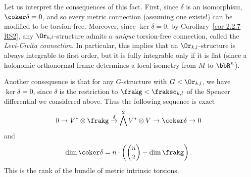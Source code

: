\begin{example}
    Let us interpret the consequences of this fact. First, since $\delta$ is an isomorphism, $\coker\delta=0$, and so every metric connection (assuming one exists!) can be modified to be torsion-free. Moreover, since $\ker\delta=0$, by Corollary~\ref{cor 2.2.7 RS2}, any $\Or_{k,l}$-structure admits a \emph{unique} torsion-free connection, called the \emph{Levi-Civita connection}.  In particular, this implies that an $\Or_{k,l}$-structure is always integrable to first order, but it is fully integrable only if it is flat (since a holonomic orthonormal frame determines a local isometry from $M$ to $\bbR^n$).

    Another consequence is that for any $G$-structure with $G<\Or_{k,l}$, we have $\ker\delta=0$, since $\delta$ is the restriction to $\frakg<\frakso_{k,l}$ of the Spencer differential we considered above. Thus the following  sequence is exact 
    \[0\to V^\ast\otimes \frakg\overset{\delta}{\to}\bigwedge^2 V^\ast\otimes V\to \coker\delta\to 0\]
    and 
    \[\dim\coker\delta =n\cdot \left(\binom{n}{2}-\dim\frakg\right).\]
    This is the rank of the bundle of metric intrinsic torsions.
\end{example}


